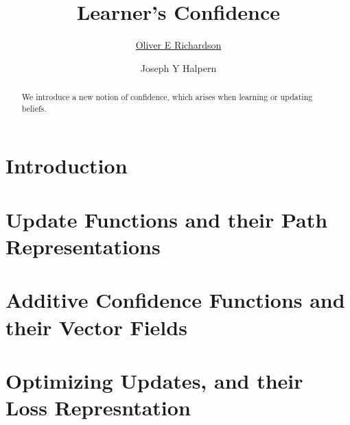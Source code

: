 \documentclass{uai2023} %
\title{%
    Learner's Confidence
}
\author[1]{\href{mailto:<oer5@cornell.edu>?Subject=confidence-paper}{Oliver E Richardson}{}}
\author[1]{Joseph Y Halpern}
\affil[1]{%
    Computer Science Dept.\\
    Cornell University\\
    Ithaca, New York, USA
}
\begin{document}
\maketitle

\begin{abstract}
We introduce a new notion of confidence, which arises when learning or updating beliefs.
\end{abstract}

\section{Introduction}\label{sec:intro}


\section{Update Functions
    and their Path Representations}


% 

\section{Additive Confidence Functions
    and their Vector Fields}


\section{Optimizing Updates, and their
    Loss Represntation}

\end{document}
